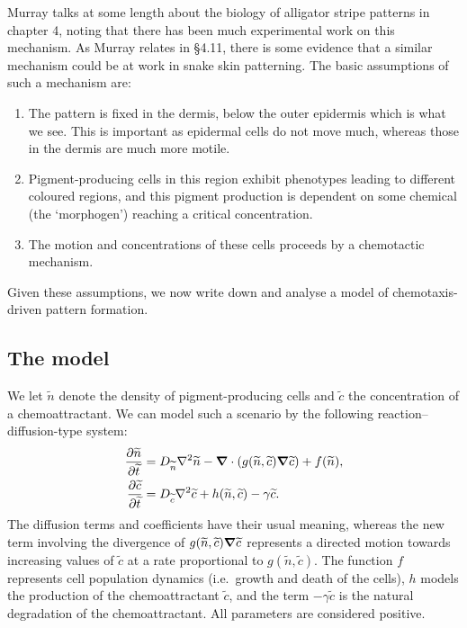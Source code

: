 \documentclass[main.tex]{subfiles}
\begin{document}
Murray talks at some length about the biology of alligator stripe patterns in chapter 4, noting that there has been much experimental work on this mechanism. As Murray relates in \S4.11, there is some evidence that a similar mechanism could be at work in snake skin patterning. The basic assumptions of such a mechanism are: 
\begin{enumerate} 
\item{The pattern is fixed in the dermis, below the outer epidermis which is what we see. This is important as epidermal cells do not move much, whereas those in the dermis are much more motile.}
\item{Pigment-producing cells in this region exhibit phenotypes leading to different coloured regions, and this pigment production is dependent on some chemical (the `morphogen') reaching a  critical concentration.}
\item{The motion and concentrations of these cells proceeds by a chemotactic mechanism. }
\end{enumerate}
Given these assumptions, we now write down and analyse a model of chemotaxis-driven pattern formation.

\subsection*{The model}
We let $\tilde{n}$ denote the density of pigment-producing cells and $\tilde{c}$ the concentration of a chemoattractant. We can model such a scenario by the following reaction--diffusion-type system:
\begin{equation}
\begin{aligned}
\label{unscaledsnake}
\pd{\tilde{n}}{\tilde{t}} &= D_{\tilde{n}}\nabla^2\tilde{n} -\vnabla\cdot\left(g(\tilde{n},\tilde{c})\vnabla \tilde{c}\right) + f(\tilde{n}),\\
\pd{\tilde{c}}{\tilde{t}} &= D_{\tilde{c}}\nabla^2\tilde{c} + h(\tilde{n},\tilde{c}) -  \gamma \tilde{c}.
\end{aligned}
\end{equation}
The diffusion terms and coefficients have their usual meaning, whereas the new term involving the divergence of $g(\widetilde{n},\widetilde{c})\bm{\nabla} \widetilde{c}$ represents a directed motion towards increasing values of $\tilde{c}$ at a rate proportional to $g(\tilde{n},\tilde{c})$. The function $f$ represents cell population dynamics (i.e.\ growth and death of the cells),  $h$ models the production of the chemoattractant $\tilde{c}$, and the term $-\gamma \tilde{c}$ is the natural degradation of the chemoattractant. All parameters are considered positive.
\end{document}
